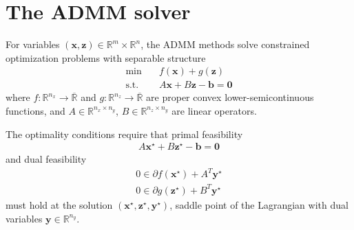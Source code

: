 \documentclass[final,3p]{elsarticle}
\newcommand{\vect}[1]{\bm{#1}}
\begin{document}
\section{The ADMM solver}




For variables $(\vect{x},\vect{z}) \in \mathbb{R}^m \times \mathbb{R}^n$, the ADMM methods solve constrained optimization problems with separable structure
\begin{subequations}
	\begin{align}
    \text{min} \quad  & f(\vect{x}) + g(\vect{z}) \\
	  \text{s.t.} \quad &  A \vect{x} + B \vect{z} - \vect{b} = \vect{0}
	\end{align}
	\label{eq:admm}
\end{subequations}
where $f : \mathbb{R}^{n_x}\rightarrow\overline{\mathbb{R}}$ and  $g : \mathbb{R}^{n_z}\rightarrow\overline{\mathbb{R}}$ are proper convex lower-semicontinuous functions,
and $A \in \mathbb{R}^{n_x \times n_y}$, $B \in \mathbb{R}^{n_z \times n_y}$ are linear operators.

The optimality conditions require that primal feasibility
\begin{align}
A \vect{x}^\star + B \vect{z}^\star - \vect{b} = \vect{0} \label{eq:primalfeasibility1}
\end{align}
and dual feasibility
\begin{subequations}
	\begin{align}
     0 \in \partial	f(\vect{x}^\star) + A^T \vect{y}^\star \label{eq:dualfeasibility1}\\
	   0 \in \partial	g(\vect{z}^\star) + B^T \vect{y}^\star \label{eq:dualfeasibility2}
	\end{align}
	\label{eq:admm}
\end{subequations}
must hold at the solution $(\vect{x}^\star,\vect{z}^\star,\vect{y}^\star)$, saddle point of the Lagrangian with dual variables $\vect{y} \in \mathbb{R}^{n_y}$.
\end{document}
